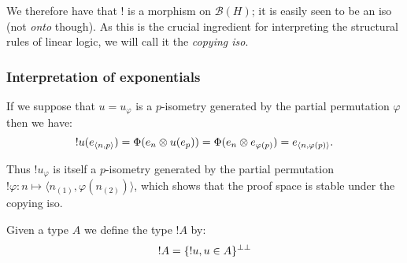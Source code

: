 We therefore have that \(!\) is a morphism on \(\mathcal{B}(H)\); it is
easily seen to be an iso (not \emph{onto} though). As this is the
crucial ingredient for interpreting the structural rules of linear
logic, we will call it the \emph{copying iso}.

\subsubsection{Interpretation of exponentials}\label{interpretation-of-exponentials}

If we suppose that \(u = u_\varphi\) is a \(p\)-isometry generated by
the partial permutation \(\varphi\) then we have:
\begin{equation*}
!u(e_{\langle n,p\rangle}) = \Phi(e_n\otimes u(e_p)) = \Phi(e_n\otimes e_{\varphi(p)}) = e_{\langle n,\varphi(p)\rangle}.
\end{equation*}

Thus \(!u_\varphi\) is itself a \(p\)-isometry generated by the partial
permutation
\(!\varphi:n\mapsto \langle n_{(1)}, \varphi(n_{(2)})\rangle\), which
shows that the proof space is stable under the copying iso.

Given a type \(A\) we define the type \(!A\) by:
\begin{equation*}
!A = \{!u, u\in A\}^{\bot\bot}
\end{equation*}


